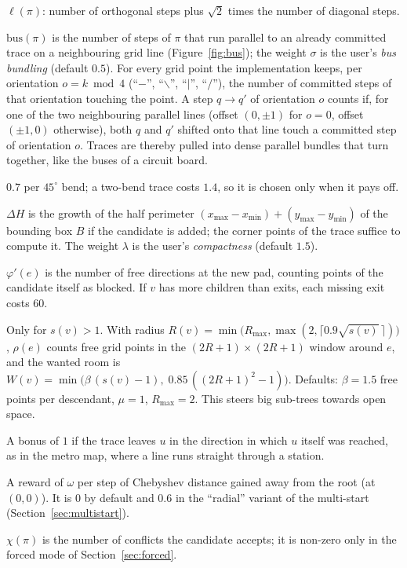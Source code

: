 \documentclass[11pt,a4paper]{article}
\theoremstyle{remark}
\newcommand{\freed}{\varphi}
\begin{document}
\begin{description}[leftmargin=1.2em,font=\normalfont\itshape]
\item[Length] $\ell(\pi)$: number of orthogonal steps plus $\sqrt2$ times the number of diagonal steps.
\item[Bus bonus] $\mathrm{bus}(\pi)$ is the number of steps of $\pi$ that run parallel to an already committed trace
  on a neighbouring grid line (Figure~\ref{fig:bus}); the weight $\sigma$ is the user's \emph{bus bundling}
  (default $0.5$). For every grid point the implementation keeps, per orientation $o=k\bmod 4$ (``$-$'', ``$\backslash$'',
  ``$|$'', ``$/$''), the number of committed steps of that orientation touching the point. A step $q\to q'$ of
  orientation $o$ counts if, for one of the two neighbouring parallel lines (offset $(0,\pm1)$ for $o=0$, offset
  $(\pm1,0)$ otherwise), both $q$ and $q'$ shifted onto that line touch a committed step of orientation $o$. Traces
  are thereby pulled into dense parallel bundles that turn together, like the buses of a circuit board.
\item[Bends] $0.7$ per $45^\circ$ bend; a two-bend trace costs $1.4$, so it is chosen only when it pays off.
\item[Compactness] $\Delta H$ is the growth of the half perimeter $(x_{\max}-x_{\min})+(y_{\max}-y_{\min})$ of the
  bounding box $B$ if the candidate is added; the corner points of the trace suffice to compute it. The weight
  $\lambda$ is the user's \emph{compactness} (default $1.5$).
\item[Exit look-ahead] $\freed'(e)$ is the number of free directions at the new pad, counting points of the
  candidate itself as blocked. If $v$ has more children than exits, each missing exit costs $60$.
\item[Room look-ahead] Only for $s(v)>1$. With radius $R(v)=\min\bigl(R_{\max},\max(2,\lceil0.9\sqrt{s(v)}\,\rceil)\bigr)$,
  $\rho(e)$ counts free grid points in the $(2R+1)\times(2R+1)$ window around $e$, and the wanted room is
  $W(v)=\min\bigl(\beta\,(s(v)-1),\;0.85\,((2R+1)^2-1)\bigr)$. Defaults: $\beta=1.5$ free points per descendant,
  $\mu=1$, $R_{\max}=2$. This steers big sub-trees towards open space.
\item[Line continuation] A bonus of $1$ if the trace leaves $u$ in the direction in which $u$ itself was reached,
  as in the metro map, where a line runs straight through a station.
\item[Radial growth] A reward of $\omega$ per step of Chebyshev distance gained away from the root (at $(0,0)$).
  It is $0$ by default and $0.6$ in the ``radial'' variant of the multi-start (Section~\ref{sec:multistart}).
\item[Collisions] $\chi(\pi)$ is the number of conflicts the candidate accepts; it is non-zero only in the forced
  mode of Section~\ref{sec:forced}.
\end{description}
\end{document}
